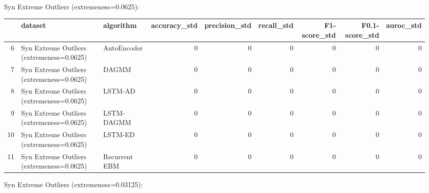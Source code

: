 Syn Extreme Outliers (extremeness=0.0625):

\begin{tabular}{rllrrrrrr}
\hline
    & dataset                                   & algorithm     &   accuracy\_std &   precision\_std &   recall\_std &   F1-score\_std &   F0.1-score\_std &   auroc\_std \\
\hline
  6 & Syn Extreme Outliers (extremeness=0.0625) & AutoEncoder   &              0 &               0 &            0 &              0 &                0 &           0 \\
  7 & Syn Extreme Outliers (extremeness=0.0625) & DAGMM         &              0 &               0 &            0 &              0 &                0 &           0 \\
  8 & Syn Extreme Outliers (extremeness=0.0625) & LSTM-AD       &              0 &               0 &            0 &              0 &                0 &           0 \\
  9 & Syn Extreme Outliers (extremeness=0.0625) & LSTM-DAGMM    &              0 &               0 &            0 &              0 &                0 &           0 \\
 10 & Syn Extreme Outliers (extremeness=0.0625) & LSTM-ED       &              0 &               0 &            0 &              0 &                0 &           0 \\
 11 & Syn Extreme Outliers (extremeness=0.0625) & Recurrent EBM &              0 &               0 &            0 &              0 &                0 &           0 \\
\hline
\end{tabular}

Syn Extreme Outliers (extremeness=0.03125):

